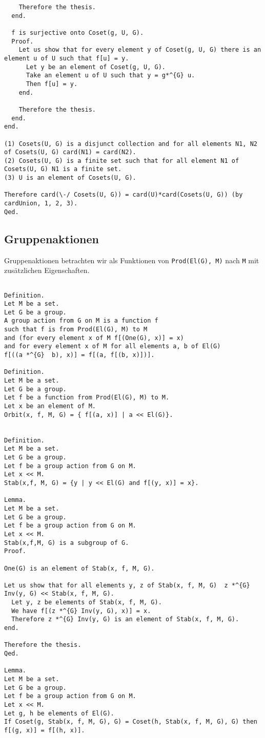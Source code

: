 \documentclass[a4paper,12pt]{scrartcl}
\begin{document}
\begin{lstlisting}
    Therefore the thesis.
  end.

  f is surjective onto Coset(g, U, G).
  Proof.
    Let us show that for every element y of Coset(g, U, G) there is an element u of U such that f[u] = y.
      Let y be an element of Coset(g, U, G).
      Take an element u of U such that y = g*^{G} u.
      Then f[u] = y.
    end.

    Therefore the thesis.
  end.
end.

(1) Cosets(U, G) is a disjunct collection and for all elements N1, N2 of Cosets(U, G) card(N1) = card(N2).
(2) Cosets(U, G) is a finite set such that for all element N1 of Cosets(U, G) N1 is a finite set.
(3) U is an element of Cosets(U, G).

Therefore card(\-/ Cosets(U, G)) = card(U)*card(Cosets(U, G)) (by cardUnion, 1, 2, 3).
Qed.
\end{lstlisting}

\subsection{Gruppenaktionen}

Gruppenaktionen betrachten wir als Funktionen von \verb!Prod(El(G), M)! nach \verb!M! mit zusätzlichen Eigenschaften.

\begin{lstlisting}

Definition.
Let M be a set.
Let G be a group.
A group action from G on M is a function f
such that f is from Prod(El(G), M) to M
and (for every element x of M f[(One(G), x)] = x)
and for every element x of M for all elements a, b of El(G)
f[((a *^{G}  b), x)] = f[(a, f[(b, x)])].

Definition.
Let M be a set.
Let G be a group.
Let f be a function from Prod(El(G), M) to M.
Let x be an element of M.
Orbit(x, f, M, G) = { f[(a, x)] | a << El(G)}.


Definition.
Let M be a set.
Let G be a group.
Let f be a group action from G on M.
Let x << M.
Stab(x,f, M, G) = {y | y << El(G) and f[(y, x)] = x}.

Lemma.
Let M be a set.
Let G be a group.
Let f be a group action from G on M.
Let x << M.
Stab(x,f,M, G) is a subgroup of G.
Proof.

One(G) is an element of Stab(x, f, M, G).

Let us show that for all elements y, z of Stab(x, f, M, G)  z *^{G} Inv(y, G) << Stab(x, f, M, G).
  Let y, z be elements of Stab(x, f, M, G).
  We have f[(z *^{G} Inv(y, G), x)] = x.
  Therefore z *^{G} Inv(y, G) is an element of Stab(x, f, M, G).
end.

Therefore the thesis.
Qed.

Lemma.
Let M be a set.
Let G be a group.
Let f be a group action from G on M.
Let x << M.
Let g, h be elements of El(G).
If Coset(g, Stab(x, f, M, G), G) = Coset(h, Stab(x, f, M, G), G) then f[(g, x)] = f[(h, x)].


\end{lstlisting}
\end{document}
